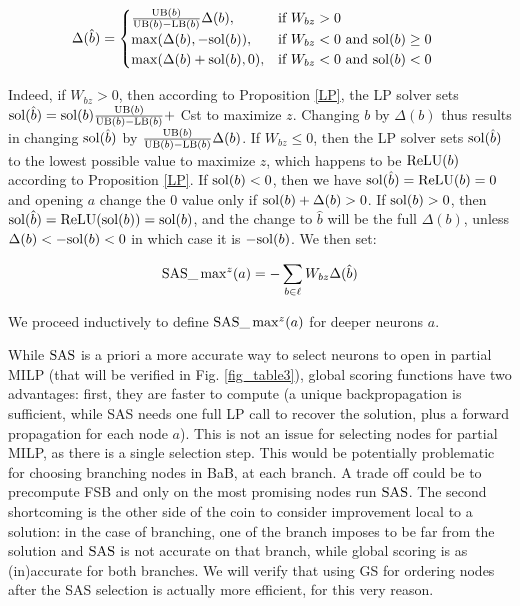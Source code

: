 	\begin{align*}
		&\Delta(\hat{b}) =
		\begin{cases}
			\frac{\mathrm{UB}(b)}{\mathrm{UB}(b)-\mathrm{LB}(b)}\Delta(b),  &\text{if }W_{bz} > 0\\
			\max(\Delta(b),-\mathrm{sol}(b)),  &\text{if }  W_{bz} < 0 \text{ and } \mathrm{sol}(b)\geq0\\
			\max(\Delta(b)+\mathrm{sol}(b),0),  &\text{if }  W_{bz} < 0 \text{ and } \mathrm{sol}(b)<0		 
		\end{cases}
		\end{align*}


Indeed, if $W_{bz}>0$, then according to Proposition \ref{LP}, the LP solver
sets $\mathrm{sol}(\hat{b}) = \mathrm{sol}(b) \frac{\mathrm{UB}(b)}{\mathrm{UB}(b)-\mathrm{LB}(b)} +$ Cst to maximize $z$.
Changing $b$ by $\Delta(b)$ thus results in changing $\mathrm{sol}(\hat{b})$ by 
$\frac{\mathrm{UB}(b)}{\mathrm{UB}(b)-\mathrm{LB}(b)}\Delta(b)$.
If $W_{bz}\leq0$, then the LP solver sets $\mathrm{sol}(\hat{b})$ to the lowest possible value to maximize $z$, which happens to be $\mathrm{ReLU}(b)$ according to Proposition \ref{LP}.
If $\mathrm{sol}(b) < 0$, then we have $\mathrm{sol}(\hat{b})=\mathrm{ReLU}(b)=0$ and opening $a$ change the 0 value only if $\mathrm{sol}(b)+\Delta(b)>0$. If $\mathrm{sol}(b) > 0$, then 
$\mathrm{sol}(\hat{b})=\mathrm{ReLU}(\mathrm{sol}(b))=\mathrm{sol}(b)$, and the change to $\hat{b}$ will be 
the full $\Delta(b)$, unless $\Delta(b) < -\mathrm{sol}(b) < 0$ in which case it is 
$-\mathrm{sol}(b)$. We then set:


$$ \mathrm{SAS}\_\max\nolimits^z(a) = -\sum_{b \in \ell} W_{bz} \Delta(\hat{b})$$
\fi

We proceed inductively to define $\mathrm{SAS}\_\max^z(a)$ for deeper neurons $a$.

While $\mathrm{SAS}$ is a priori a more accurate way to select neurons to open in partial MILP (that will be verified in Fig. \ref{fig_table3}), global scoring functions have two advantages: first, they are faster to compute (a unique backpropagation is sufficient, while SAS needs one full LP call to recover the solution, plus a forward propagation for each node $a$). This is not an issue for selecting nodes for partial MILP, as there is a single selection step. This would be potentially problematic for choosing branching nodes in BaB, at each branch. A trade off could be to precompute FSB and only on the most promising nodes run $\mathrm{SAS}$. The second shortcoming is the other side of the coin to consider improvement local to a solution: in the case of branching, one of the branch imposes to be far from the solution and $\mathrm{SAS}$ is not accurate on that branch, while global scoring is as (in)accurate for both branches. We will verify that using GS for ordering nodes after the SAS selection is actually more efficient, for this very reason.

